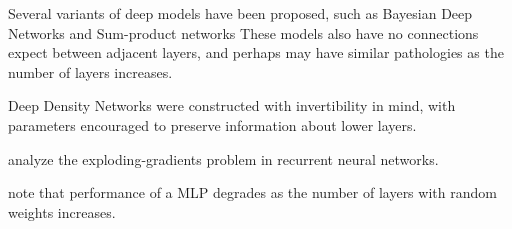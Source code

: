 \documentclass{article}
\begin{document}
Several variants of deep models have been proposed, such as Bayesian Deep Networks \cite{adams2010learning} and Sum-product networks \cite{poon2011sum}  
These models also have no connections expect between adjacent layers, and perhaps may have similar pathologies as the number of layers increases.

Deep Density Networks \cite{rippel2013high} were constructed with invertibility in mind, with parameters encouraged to preserve information about lower layers.



\cite{pascanu2012understanding} analyze the exploding-gradients problem in recurrent neural networks.



\cite{montavon2010layer} note that performance of a MLP degrades as the number of layers with random weights increases.


\end{document}
